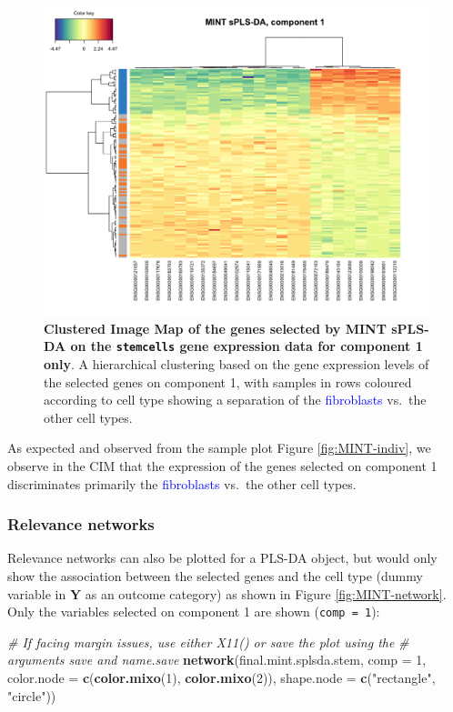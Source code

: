 \documentclass[]{book}
\newenvironment{Shaded}{\begin{snugshade}}{\end{snugshade}}
\newcommand{\KeywordTok}[1]{\textcolor[rgb]{0.13,0.29,0.53}{\textbf{#1}}}
\newcommand{\DataTypeTok}[1]{\textcolor[rgb]{0.13,0.29,0.53}{#1}}
\newcommand{\DecValTok}[1]{\textcolor[rgb]{0.00,0.00,0.81}{#1}}
\newcommand{\StringTok}[1]{\textcolor[rgb]{0.31,0.60,0.02}{#1}}
\newcommand{\CommentTok}[1]{\textcolor[rgb]{0.56,0.35,0.01}{\textit{#1}}}
\newcommand{\NormalTok}[1]{#1}
\begin{document}
\begin{figure}

{\centering \includegraphics[width=0.5\linewidth]{Figures/MINT/MINT-cim-1} 

}

\caption{\textbf{Clustered Image Map of the genes selected by MINT
sPLS-DA on the \texttt{stemcells} gene expression data for component 1
only}. A hierarchical clustering based on the gene expression levels of
the selected genes on component 1, with samples in rows coloured
according to cell type showing a separation of the
\textcolor{blue}{fibroblasts} vs.~the other cell types.}\label{fig:MINT-cim}
\end{figure}








As expected and observed from the sample plot Figure
\ref{fig:MINT-indiv}, we observe in the CIM that the expression of the
genes selected on component 1 discriminates primarily the
\textcolor{blue}{fibroblasts} vs.~the other cell types.

\subsubsection{Relevance networks}\label{relevance-networks}

Relevance networks can also be plotted for a PLS-DA object, but would
only show the association between the selected genes and the cell type
(dummy variable in \(\boldsymbol Y\) as an outcome category) as shown in
Figure \ref{fig:MINT-network}. Only the variables selected on component
1 are shown (\texttt{comp\ =\ 1}):

\begin{Shaded}
\begin{Highlighting}[]
\CommentTok{# If facing margin issues, use either X11() or save the plot using the}
\CommentTok{# arguments save and name.save}
\KeywordTok{network}\NormalTok{(final.mint.splsda.stem, }\DataTypeTok{comp =} \DecValTok{1}\NormalTok{,}
        \DataTypeTok{color.node =} \KeywordTok{c}\NormalTok{(}\KeywordTok{color.mixo}\NormalTok{(}\DecValTok{1}\NormalTok{), }\KeywordTok{color.mixo}\NormalTok{(}\DecValTok{2}\NormalTok{)), }
        \DataTypeTok{shape.node =} \KeywordTok{c}\NormalTok{(}\StringTok{"rectangle"}\NormalTok{, }\StringTok{"circle"}\NormalTok{))}
\end{Highlighting}
\end{Shaded}
\end{document}

